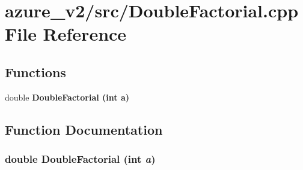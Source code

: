 \section{azure\_\-v2/src/Double\-Factorial.cpp File Reference}
\label{DoubleFactorial_8cpp}
\subsection*{Functions}
\begin{CompactItemize}
\item 
double \bf{Double\-Factorial} (int a)
\end{CompactItemize}


\subsection{Function Documentation}
\subsubsection{\setlength{\rightskip}{0pt plus 5cm}double Double\-Factorial (int {\em a})}\label{DoubleFactorial_8cpp_945d6105c908a8fb873493612c90d49d}



